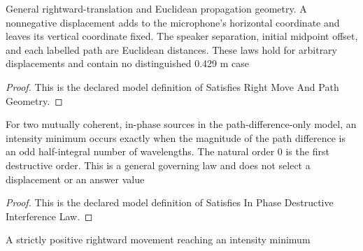 \begin{definition}
  \label{def:physics:phyx-mini-0219:phyxminiproblems-problemphyxmini0219-satisfiesrightmoveandpathgeometry}
  General rightward-translation and Euclidean propagation geometry. A nonnegative displacement adds to the microphone's horizontal coordinate and leaves its vertical coordinate fixed. The speaker separation, initial midpoint offset, and each labelled path are Euclidean distances. These laws hold for arbitrary displacements and contain no distinguished 0.429 m case
\end{definition}
\begin{proof}
  This is the declared model definition of Satisfies Right Move And Path Geometry.
\end{proof}
\begin{definition}
  \label{def:physics:phyx-mini-0219:phyxminiproblems-problemphyxmini0219-satisfiesinphasedestructiveinterferencelaw}
  For two mutually coherent, in-phase sources in the path-difference-only model, an intensity minimum occurs exactly when the magnitude of the path difference is an odd half-integral number of wavelengths. The natural order 0 is the first destructive order. This is a general governing law and does not select a displacement or an answer value
\end{definition}
\begin{proof}
  This is the declared model definition of Satisfies In Phase Destructive Interference Law.
\end{proof}
\begin{definition}
  \label{def:physics:phyx-mini-0219:phyxminiproblems-problemphyxmini0219-ispositiverightmovetominimum}
  A strictly positive rightward movement reaching an intensity minimum
\end{definition}
